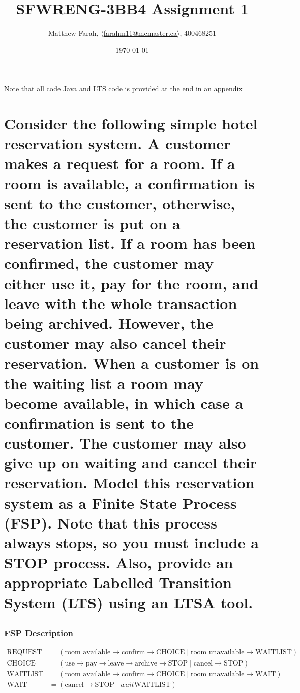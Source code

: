 \documentclass{article}[8pt]
\title{\vspace{-2cm}SFWRENG-3BB4 Assignment 1\vspace{-.3cm}}
\author{Matthew Farah, \href{mailto:farahm11@mcmaster.ca}{$\langle$farahm11@mcmaster.ca$\rangle$}, 400468251}
\date{\today}
\renewcommand{\thesubsubsection}{\thesection.\alph{subsection}.\Roman{subsubsection}}
\begin{document}
\maketitle

\begin{center}
	Note that all code Java and LTS code is provided at the end in an appendix
\end{center}

\section[Question ~\thesection]{Consider the following simple hotel reservation system. A customer makes a request for a room. If a room is available, a confirmation is sent to the customer, otherwise, the customer is put on a reservation list. If a room has been confirmed, the customer may either use it, pay for the room, and leave with the whole transaction being archived. However, the customer may also cancel their reservation. When a customer is on the waiting list a room may become available, in which case a confirmation is sent to the customer. The customer may also give up on waiting and cancel their reservation. Model this reservation system as a Finite State Process (FSP). Note that this process always stops, so you must include a STOP process. Also, provide an appropriate Labelled Transition System (LTS) using an LTSA tool.}

\subsection{}

\subsubsection[~\thesubsubsection]{FSP Description}

\begin{align*}
	\text{REQUEST} &= (\text{room\_available} \rightarrow \text{confirm} \rightarrow \text{CHOICE} \; | \; \text{room\_unavailable} \rightarrow \text{WAITLIST}) \\
	\text{CHOICE} &= (\text{use} \rightarrow \text{pay} \rightarrow \text{leave} \rightarrow \text{archive} \rightarrow \text{STOP} \; | \; \text{cancel} \rightarrow \text{STOP}) \\
	\text{WAITLIST} &= (\text{room\_available} \rightarrow \text{confirm} \rightarrow \text{CHOICE} \; | \; \text{room\_unavailable} \rightarrow \text{WAIT}) \\
	\text{WAIT} &= (\text{cancel} \rightarrow \text{STOP} \; | \; wait \text{WAITLIST})
\end{align*}
\end{document}

